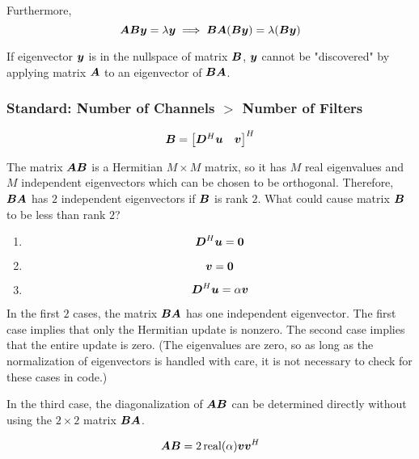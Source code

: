 \documentclass{article}
\begin{document}
Furthermore,
\begin{equation}
\bm{A}\bm{B}\bm{y} = \lambda\bm{y} \implies \bm{B}\bm{A}(\bm{B}\bm{y}) = \lambda (\bm{B}\bm{y})
\end{equation}

If eigenvector $\bm{y}$ is in the nullspace of matrix $\bm{B}$, $\bm{y}$ cannot be "discovered" by applying matrix $\bm{A}$ to an eigenvector of $\bm{B}\bm{A}$.

\subsubsection{Standard: Number of Channels $>$ Number of Filters}

\begin{equation}
\bm{B} = \begin{bmatrix} \bm{D}^H\bm{u} & \bm{v}\end{bmatrix}^H
\end{equation}


The matrix $\bm{A}\bm{B}$ is a Hermitian $M \times M$ matrix, so it has $M$ real eigenvalues and $M$ independent eigenvectors which can be chosen to be orthogonal. Therefore, $\bm{B}\bm{A}$ has $2$ independent eigenvectors if $\bm{B}$ is rank $2$.  What could cause matrix $\bm{B}$ to be less than rank $2$?


\begin{enumerate}
\item
\begin{equation}
\bm{D}^H\bm{u} = \bm{0}
\end{equation}
\item

\begin{equation}
\bm{v} = \bm{0}
\end{equation}
\item
\begin{equation}
\bm{D}^H\bm{u} = \alpha \bm{v}
\end{equation}
\end{enumerate}

In the first $2$ cases, the matrix $\bm{B}\bm{A}$ has one independent eigenvector. The first case implies that only the Hermitian update is nonzero.  The second case implies that the entire update is zero. (The eigenvalues are zero, so as long as the normalization of eigenvectors is handled with care, it is not necessary to check for these cases in code.)

In the third case, the diagonalization of $\bm{A}\bm{B}$ can be determined directly without using the $2 \times 2$ matrix $\bm{B}\bm{A}$.

\begin{equation}
\bm{A}\bm{B} = 2\operatorname{real}(\alpha)\bm{v}\bm{v}^H
\end{equation}
\end{document}
